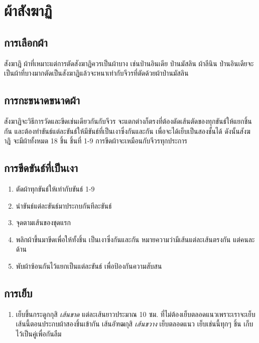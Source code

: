 \chapter{ผ้าสังฆาฏิ}

\section{การเลือกผ้า}

สังฆาฎิ ผ้าที่เหมาะแต่การตัดสังฆาฏิควรเป็นผ้าบาง เช่นป่านอินเดีย ป่านมัสลิน ผ้าลีนิน
ป่านอินเดียจะเป็นผ้าที่บางมากตัดเป็นสังฆาฏิแล้วจะหนาเท่ากับจีวรที่ตัดด้วยผ้าป่านมัสลิน

\section{การกะขนาดขนาดผ้า}

สังฆาฏิจะวิธีการวัดและขีดเช่นเดียวกันกับจีวร
จะแตกต่างก็ตรงที่ต้องตัดเส้นตัดของทุกขันธ์ให้แยกชิ้นกัน
และต้องทำขันธ์แต่ละขันธ์ให้มีขันธ์ที่เป็นเงาซึ่งกันและกัน เพื่อจะได้เย็บเป็นสองชั้นได้ ดังนั้นสังฆาฎิ
จะมีผ้าทั้งหมด 18 ชิ้น ชิ้นที่ 1-9 การขีดผ้าจะเหมือนกับจีวรทุกประการ

\section{การขีดขันธ์ที่เป็นเงา}

\begin{enumerate}
\def\labelenumi{(\arabic{enumi})}
\item
  ตัดผ้าทุกขันธ์ให้เท่ากับขันธ์ 1-9
\item
  นำขันธ์แต่ละขันธ์มาประกบกันทีละขันธ์
\item
  จุดตามเส้นของชุดแรก
\item
  พลิกผ้าขึ้นมาขีดเพื่อให้ทั้งชิ้น เป็นเงาซึ่งกันและกัน หมายความว่ามีเส้นแต่ละเส้นตรงกัน
  แต่คนละด้าน
\item
  พับผ้าซ้อนกันไว้แยกเป็นแต่ละขันธ์ เพื่อป้องกันความสับสน
\end{enumerate}

\section{การเย็บ}

\begin{enumerate}
\def\labelenumi{(\arabic{enumi})}
\tightlist
\item
  เย็บขึ้นกระดูกกุสิ \emph{เส้นขาด} แต่ละเส้นยาวประมาณ 10 ซม.
  ที่ไม่ต้องเย็บตลอดแนวเพราะเราจะเย็บเส้นนี้ตอนประกบผ้าสองชิ้นเข้ากัน เส้นอัฑฒกุสิ
  \emph{เส้นขวาง} เย็บตลอดแนว เย็บเช่นนี้ทุกๆ ชิ้น เก็บไว้เป็นคู่เพื่อกันลืม
\end{enumerate}

